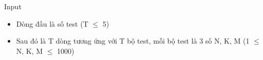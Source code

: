 Input  
\begin{itemize}
	\item     Dòng đầu là số test (T  $\le$  5)   
	\item     Sau đó là T dòng tương ứng với T bộ test, mỗi bộ test là 3 số N, K, M (1  $\le$  N, K, M  $\le$  1000)   
\end{itemize}
